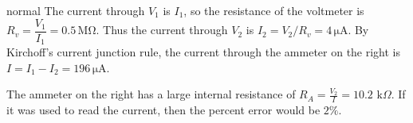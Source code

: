 \begin{solution}{normal}
The current through $V_1$ is $I_1$, so the resistance of the voltmeter is $R_v = \dfrac{V_1}{I_1} = 0.5 \, \mathrm{M\Omega}$. Thus the current through $V_2$ is $I_2 = V_2/R_v = 4\, \mathrm{\mu A}$. By Kirchoff's current junction rule, the current through the ammeter on the right is $I = I_1 - I_2 = \boxed{196 \, \mathrm{\mu A}}$.

The ammeter on the right has a large internal resistance of $R_A = \frac{V_2}{I}=10.2 \text{ k}\Omega$. If it was used to read the current, then the percent error would be $2\%$.
\end{solution}